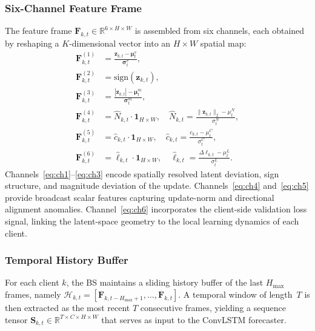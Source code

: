 \documentclass[journal]{IEEEtran}
\begin{document}
\subsubsection{Six-Channel Feature Frame}
The feature frame $\mathbf{F}_{k,t} \in \mathbb{R}^{6 \times H \times W}$ is assembled from six channels, each obtained by reshaping a $K$-dimensional vector into an $H \times W$ spatial map:
\begin{align}
\mathbf{F}_{k,t}^{(1)} &= \frac{\mathbf{z}_{k,t} - \boldsymbol{\mu}_t^v}{\boldsymbol{\sigma}_t^v}, \label{eq:ch1}\\
\mathbf{F}_{k,t}^{(2)} &= \text{sign}(\mathbf{z}_{k,t}), \label{eq:ch2}\\
\mathbf{F}_{k,t}^{(3)} &= \frac{|\mathbf{z}_{k,t}| - \boldsymbol{\mu}_t^m}{\boldsymbol{\sigma}_t^m}, \label{eq:ch3}\\
\mathbf{F}_{k,t}^{(4)} &= \hat{N}_{k,t} \cdot \mathbf{1}_{H \times W}, \quad \hat{N}_{k,t} = \frac{\|\mathbf{z}_{k,t}\|_2 - \mu_t^N}{\sigma_t^N}, \label{eq:ch4}\\
\mathbf{F}_{k,t}^{(5)} &= \hat{c}_{k,t} \cdot \mathbf{1}_{H \times W}, \quad \hat{c}_{k,t} = \frac{c_{k,t} - \mu_t^C}{\sigma_t^C}, \label{eq:ch5}\\
\mathbf{F}_{k,t}^{(6)} &= \hat{\ell}_{k,t} \cdot \mathbf{1}_{H \times W}, \quad \hat{\ell}_{k,t} = \frac{\Delta\ell_{k,t} - \mu_t^L}{\sigma_t^L}. \label{eq:ch6}
\end{align}
Channels~\eqref{eq:ch1}--\eqref{eq:ch3} encode spatially resolved latent deviation, sign structure, and magnitude deviation of the update. Channels~\eqref{eq:ch4} and~\eqref{eq:ch5} provide broadcast scalar features capturing update-norm and directional alignment anomalies. Channel~\eqref{eq:ch6} incorporates the client-side validation loss signal, linking the latent-space geometry to the local learning dynamics of each client.

\subsubsection{Temporal History Buffer}
For each client $k$, the BS maintains a sliding history buffer of the last $H_{\max}$ frames, namely $\mathcal{H}_{k,t} = [\mathbf{F}_{k,t-H_{\max}+1}, \ldots, \mathbf{F}_{k,t}]$. A temporal window of length~$T$ is then extracted as the most recent $T$ consecutive frames, yielding a sequence tensor $\mathbf{S}_{k,t} \in \mathbb{R}^{T \times C \times H \times W}$ that serves as input to the ConvLSTM forecaster.
\end{document}
